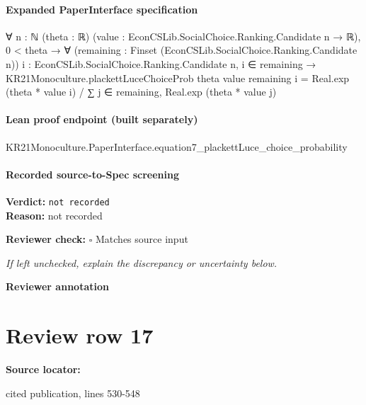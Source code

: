 \documentclass[10pt]{article}
\newcommand{\reviewerbox}{%
  \par\noindent\fbox{\parbox{0.96\linewidth}{\rule{0pt}{0.38in}}}\par
}
\newcommand{\reviewmatch}[1]{%
  \par\noindent\textbf{Reviewer check:} $\square$\; #1\par
  \noindent\emph{If left unchecked, explain the discrepancy or uncertainty below.}\par
}
\begin{document}
\paragraph{Expanded PaperInterface specification}
\begin{ReviewVerbatim}
∀ {n : ℕ} (theta : ℝ) (value : EconCSLib.SocialChoice.Ranking.Candidate n → ℝ),
  0 < theta →
    ∀ (remaining : Finset (EconCSLib.SocialChoice.Ranking.Candidate n))
      {i : EconCSLib.SocialChoice.Ranking.Candidate n},
      i ∈ remaining →
        KR21Monoculture.plackettLuceChoiceProb theta value remaining i =
          Real.exp (theta * value i) / ∑ j ∈ remaining, Real.exp (theta * value j)
\end{ReviewVerbatim}

\paragraph{Lean proof endpoint (built separately)}\begin{ReviewVerbatim}
KR21Monoculture.PaperInterface.equation7_plackettLuce_choice_probability
\end{ReviewVerbatim}

\paragraph{Recorded source-to-Spec screening}
\textbf{Verdict:} \texttt{not recorded}
\\
\textbf{Reason:} not recorded
\reviewmatch{Matches source input}
\noindent\textbf{Reviewer annotation}\par
\reviewerbox
\clearpage
\hypertarget{source-claim-0156e1eedd228cc4}{}
\section*{Review row 17}
\textbf{Source locator:} {\footnotesize\raggedright cited publication, lines 530-\allowbreak{}548\par}
\end{document}
